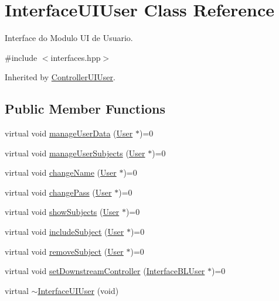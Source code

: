 \hypertarget{class_interface_u_i_user}{}\section{Interface\+U\+I\+User Class Reference}
\label{class_interface_u_i_user}


Interface do Modulo UI de Usuario.  




{\ttfamily \#include $<$interfaces.\+hpp$>$}



Inherited by \hyperlink{class_controller_u_i_user}{Controller\+U\+I\+User}.

\subsection*{Public Member Functions}
\begin{DoxyCompactItemize}
\item 
virtual void \hyperlink{class_interface_u_i_user_a167f4ea2954c5b4e81d175bca1cee1f9}{manage\+User\+Data} (\hyperlink{class_user}{User} $\ast$)=0
\item 
virtual void \hyperlink{class_interface_u_i_user_a3830114ce74533d9ba66b0baaac79f0b}{manage\+User\+Subjects} (\hyperlink{class_user}{User} $\ast$)=0
\item 
virtual void \hyperlink{class_interface_u_i_user_a2d8e9c81dabab905f06eacdc474d928d}{change\+Name} (\hyperlink{class_user}{User} $\ast$)=0
\item 
virtual void \hyperlink{class_interface_u_i_user_a56170420b7ce8f3a69c1097aa4fb19d7}{change\+Pass} (\hyperlink{class_user}{User} $\ast$)=0
\item 
virtual void \hyperlink{class_interface_u_i_user_ad3e4efe4c7292c8a677fd8eeefcf6ae4}{show\+Subjects} (\hyperlink{class_user}{User} $\ast$)=0
\item 
virtual void \hyperlink{class_interface_u_i_user_a9e578488a9effc0f41f4ac034b6744cf}{include\+Subject} (\hyperlink{class_user}{User} $\ast$)=0
\item 
virtual void \hyperlink{class_interface_u_i_user_a2f1348af12103048245fcf31e9677994}{remove\+Subject} (\hyperlink{class_user}{User} $\ast$)=0
\item 
virtual void \hyperlink{class_interface_u_i_user_a304a797f05d78a08f3ed2116c7a0028a}{set\+Downstream\+Controller} (\hyperlink{class_interface_b_l_user}{Interface\+B\+L\+User} $\ast$)=0
\item 
virtual \hyperlink{class_interface_u_i_user_a1a3ad0594545402e992832378da51171}{$\sim$\+Interface\+U\+I\+User} (void)
\end{DoxyCompactItemize}


